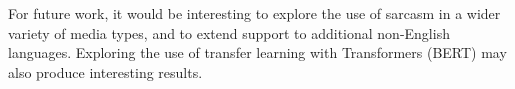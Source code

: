 \documentclass[12pt,a4paper]{article}
\begin{document}
For future work, it would be interesting to explore the use of sarcasm in a wider variety of media types, and to extend support to additional non-English languages. Exploring the use of transfer learning with Transformers (BERT) may also produce interesting results.







\end{document}
